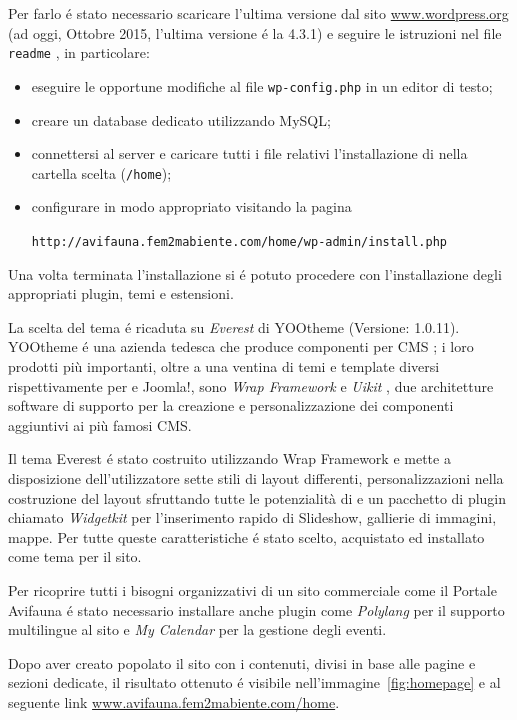 Per farlo é stato necessario scaricare l'ultima versione dal sito \url{www.wordpress.org} (ad oggi, Ottobre 2015, l'ultima versione é la 4.3.1) e seguire le istruzioni nel file \texttt{readme} \cite{installing_wordpress}, in particolare:
\begin{itemize}
\item eseguire le opportune modifiche al file \texttt{wp-config.php} in un editor di testo;
\item creare un database dedicato utilizzando MySQL;
\item connettersi al server e caricare tutti i file relativi l'installazione di {\wp} nella cartella scelta (\texttt{/home});
\item configurare in modo appropriato visitando la pagina 

\texttt{http://avifauna.fem2mabiente.com/home/wp-admin/install.php}
\end{itemize}

Una volta terminata l'installazione si é potuto procedere con l'installazione degli appropriati plugin, temi e estensioni.

La scelta del tema é ricaduta su \emph{Everest} di YOOtheme (Versione: 1.0.11). YOOtheme é una azienda tedesca che produce componenti per CMS \cite{yootheme}; i loro prodotti più importanti, oltre a una ventina di temi e template diversi rispettivamente per {\wp} e Joomla!, sono \emph{Wrap Framework} \cite{wrap} e \emph{Uikit} \cite{uikit}, due architetture software di supporto per la creazione e personalizzazione dei componenti aggiuntivi ai più famosi CMS.

Il tema Everest é stato costruito utilizzando Wrap Framework e mette a disposizione dell'utilizzatore sette stili di layout differenti, personalizzazioni nella costruzione del layout sfruttando tutte le potenzialità di {\wp} e un pacchetto di plugin chiamato \emph{Widgetkit} per l'inserimento rapido di Slideshow, gallierie di immagini, mappe. Per tutte queste caratteristiche é stato scelto, acquistato ed installato come tema per il sito.

Per ricoprire tutti i bisogni organizzativi di un sito commerciale come il Portale Avifauna é stato necessario installare anche plugin come \emph{Polylang} \cite{polylang} per il supporto multilingue al sito e \emph{My Calendar} \cite{mycalendar} per la gestione degli eventi.

Dopo aver creato popolato il sito con i contenuti, divisi in base alle pagine e sezioni dedicate, il risultato ottenuto é visibile nell'immagine~\ref{fig:homepage} e al seguente link \url{www.avifauna.fem2mabiente.com/home}.

